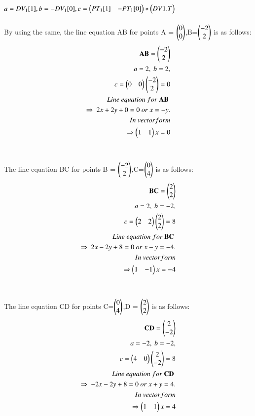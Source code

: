\documentclass[journal,12pt,twocolumn]{IEEEtran}
\begin{document}
$a= DV_1[1],\\ b=-DV_1[0],\\ c = \begin{pmatrix}PT_1[1]&-PT_1[0]\end{pmatrix}* \begin{pmatrix}DV1.T\end{pmatrix}$
\\
\\
By using the same, the line equation AB for points A = $\begin{pmatrix}0\\0\end{pmatrix}$,B=$\begin{pmatrix}-2\\2\end{pmatrix}$ is as follows:
\\
\begin{align}
\begin{split}
\mathbf{AB} = \begin{pmatrix}-2\\2\end{pmatrix}\\
a=2,\ b=2,\\
c=\begin{pmatrix}0 & 0\end{pmatrix} \begin{pmatrix}-2\\2\end{pmatrix}=0\\
Line\ equation\ for\ \mathbf{AB}\ \\ \Rightarrow\ 2x+2y+0=0 \ or \ x=-y. \\
In\ vector form\\
\Rightarrow \begin{pmatrix}1&1\end{pmatrix}x=0\\
\end{split}
\end{align}
\\
\\
The line equation BC for points B = $\begin{pmatrix}-2\\2\end{pmatrix}$,C=$\begin{pmatrix}0\\4\end{pmatrix}$ is as follows:
\\
\begin{align}
\begin{split}
\mathbf{BC} = \begin{pmatrix}2\\2\end{pmatrix}\\
a=2,\ b=-2,\\
c=\begin{pmatrix}2 & 2\end{pmatrix} \begin{pmatrix}2\\2\end{pmatrix}=8\\
Line\ equation\ for\ \mathbf{BC}\ \\ \Rightarrow\ 2x-2y+8=0 \ or \ x-y=-4. \\
In\ vector form\\
\Rightarrow \begin{pmatrix}1&-1\end{pmatrix}x=-4
\end{split}
\end{align}
\\
\\
The line equation CD for points C=$\begin{pmatrix}0\\4\end{pmatrix}$,D = $\begin{pmatrix}2\\2\end{pmatrix}$ is as follows:
\\
\begin{align}
\begin{split}
\mathbf{CD} = \begin{pmatrix}2\\-2\end{pmatrix}\\
a=-2,\ b=-2,\\
c=\begin{pmatrix}4 & 0\end{pmatrix} \begin{pmatrix}2\\-2\end{pmatrix}=8\\
Line\ equation\ for\ \mathbf{CD}\ \\ \Rightarrow\ -2x-2y+8=0 \ or \ x+y=4. \\
In\ vector form\\
\Rightarrow \begin{pmatrix}1&1\end{pmatrix}x=4
\end{split}
\end{align}
\end{document}
